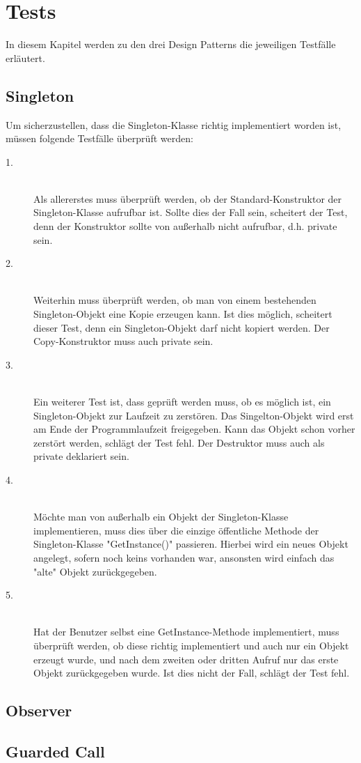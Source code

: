 \chapter{Tests}

In diesem Kapitel werden zu den drei Design Patterns die jeweiligen Testfälle erläutert.

\section{Singleton}

Um sicherzustellen, dass die Singleton-Klasse richtig implementiert worden ist, müssen folgende Testfälle überprüft werden: 

\begin{description}
  \item[1.] \hfill \\
  Als allererstes muss überprüft werden, ob der Standard-Konstruktor der Singleton-Klasse aufrufbar ist. Sollte dies der Fall sein, scheitert der Test, denn der Konstruktor sollte von außerhalb nicht aufrufbar, d.h. private sein.
  \item[2.] \hfill \\
  Weiterhin muss überprüft werden, ob man von einem bestehenden Singleton-Objekt eine Kopie erzeugen kann. Ist dies möglich, scheitert dieser Test, denn ein Singleton-Objekt darf nicht kopiert werden. Der Copy-Konstruktor muss auch private sein.
  \item[3.] \hfill \\
  Ein weiterer Test ist, dass geprüft werden muss, ob es möglich ist, ein Singleton-Objekt zur Laufzeit zu zerstören. Das Singelton-Objekt wird erst am Ende der Programmlaufzeit freigegeben. Kann das Objekt schon vorher zerstört werden, schlägt der Test fehl. Der Destruktor muss auch als private deklariert sein.
  \item[4.] \hfill \\
  Möchte man von außerhalb ein Objekt der Singleton-Klasse implementieren, muss dies über die einzige öffentliche Methode der Singleton-Klasse "GetInstance()" passieren. Hierbei wird ein neues Objekt angelegt, sofern noch keins vorhanden war, ansonsten wird einfach das "alte" Objekt zurückgegeben.
  \item[5.] \hfill \\
  Hat der Benutzer selbst eine GetInstance-Methode implementiert, muss überprüft werden, ob diese richtig implementiert und auch nur ein Objekt erzeugt wurde, und nach dem zweiten oder dritten Aufruf nur das erste Objekt zurückgegeben wurde. Ist dies nicht der Fall, schlägt der Test fehl.
\end{description}

\section{Observer}

\section{Guarded Call}



